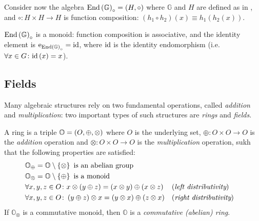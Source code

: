 \begin{example}\label{ex:endo_monoid}
  Consider now the algebra \(\mathrm{End}\left(\mathbb{G}\right)_{\circ} = \left(H, \circ\right)\) 
  where \(\mathbb{G}\) and \(H\) are defined as in , and 
  \(\circ\colon H \times H \to H\) is function composition: 
  \(\left(h_1 \circ h_2\right)\left(x\right) \equiv h_1\left(h_2\left(x\right)\right)\).
  
  \(\mathrm{End}\left(\mathbb{G}\right)_{\circ}\) is a monoid: function composition is associative, and the 
  identity element is \(\mathrm{e}_{\mathrm{End}\left(\mathbb{G}\right)_{\circ}} = \mathrm{id} \), where \(\mathrm{id} \) is the
  identity endomorphism (i.e. \(\forall x \in G\colon \mathrm{id}\left(x\right) = x\)). 
\end{example}

\subsection{Fields}
Many algebraic structures rely on two fundamental operations, called \emph{addition} and 
\emph{multiplication}: two important types of such structures are \emph{rings} and \emph{fields}.
\begin{definition}[Ring]
  A ring is a triple \(\mathbb{O} = \left(O, \oplus, \otimes\right)\) where \(O\) is the 
  underlying set, \(\oplus\colon O \times O \to O\) is the \emph{addition} operation and 
  \(\otimes\colon O \times O \to O\) is the \emph{multiplication} operation, sukh that the 
  following properties are satisfied:
  \begin{align*}
    & \mathbb{O}_{\oplus} = \mathbb{O} \setminus \left\{\otimes\right\}
      \textnormal{ is an abelian group} \\
    & \mathbb{O}_{\otimes} = \mathbb{O} \setminus \left\{\oplus\right\} 
      \textnormal{ is a monoid} \\
    & \forall x,y,z \in O\colon x \otimes \left(y \oplus z\right) = 
      \left(x \otimes y\right) \oplus \left(x \otimes z\right) && (\emph{left distributivity})\\
    & \forall x,y,z \in O\colon \left(y \oplus z\right) \otimes x = 
      \left(y \otimes x\right) \oplus \left(z \otimes x\right) && (\emph{right distributivity})
  \end{align*}
  If \(\mathbb{O}_{\otimes}\) is a commutative monoid, then \(\mathbb{O}\) is a 
  \emph{commutative (abelian) ring}.
\end{definition}

